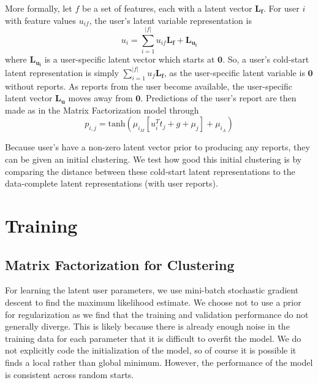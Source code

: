 \documentclass{article}
\begin{document}
More formally, let $f$ be a set of features, each with a latent vector $\mathbf{L_{f}}$. For user $i$ with feature values $u_{if}$, the user's latent variable representation is $$u_{i} = \sum_{i=1}^{\vert f \vert} u_{if} \mathbf{L_{f}} + \mathbf{L_{u_{i}}}$$ where $\mathbf{L_{u_{i}}}$ is a user-specific latent vector which starts at $\mathbf{0}$. So, a user's cold-start latent representation is simply $\sum_{i=1}^{\vert f \vert} u_{f} \mathbf{L_{f}}$, as the user-specific latent variable is $\mathbf{0}$ without reports. As reports from the user become available, the user-specific latent vector $\mathbf{L_{u}}$ moves away from $\mathbf{0}$. Predictions of the user's report are then made as in the Matrix Factorization model through  
$$
  p_{i,j} = \textrm{tanh}\left( \mu_{i_M}\left[u_i^{T}t_j + g + \mu_j\right] + \mu_{i_A}\right)
 $$

Because user's have a non-zero latent vector prior to producing any reports, they can be given an initial clustering. We test how good this initial clustering is by comparing the distance between these cold-start latent representations to the data-complete latent representations (with user reports).

\section{Training}\label{sec:training}

%
%

\subsection{Matrix Factorization for Clustering}
For learning the latent user parameters, we use mini-batch stochastic gradient descent to find the maximum likelihood estimate. We choose not to use a prior for regularization as we find that the training and validation performance do not generally diverge. This is likely because there is already enough noise in the training data for each parameter that it is difficult to overfit the model. We do not explicitly code the initialization of the model, so of course it is possible it finds a local rather than global minimum. However, the performance of the model is consistent across random starts.
\end{document}
